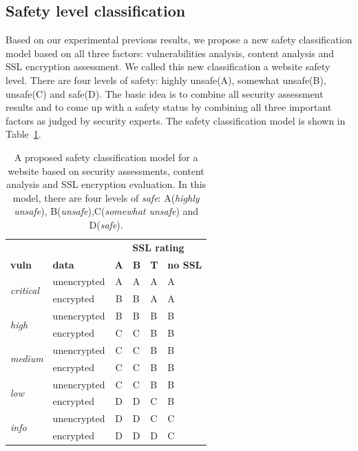 \documentclass[conference,letterpaper]{IEEEtran}
\begin{document}
\subsection{Safety level classification}

Based on our experimental previous results, we propose a new safety
classification model based on all three factors: vulnerabilities
analysis, content analysis and SSL encryption assessment. We called
this new classification a website safety level. There are four levels
of safety: highly unsafe(A), somewhat unsafe(B), unsafe(C) and
safe(D).  The basic idea is to combine all security assessment results
and to come up with a safety status by combining all three important
factors as judged by security experts. The safety classification model 
is shown in
Table~\ref{tab:class}.

\begin{table}[thbp]
  \caption{A proposed safety classification model for a website based on
    security assessments, content analysis and SSL encryption
    evaluation. In this model, there are four levels of
    \emph{safe}: A(\emph{highly unsafe}), B(\emph{unsafe}),C(\emph{somewhat unsafe}) and D(\emph{safe}).}
	\label{tab:class}
	\centering
	\begin{tabular}{llclll}
          &  & \multicolumn{4}{c}{\textbf{SSL rating}} \\ \cline{3-6} 
          \textbf{vuln}& \textbf{data} & \textbf{A} & \textbf{B} & \textbf{T} &
                                                                                \textbf{no SSL} \\ \hline
          \multirow{2}{*}{\textit{critical}} & unencrypted & A & A & A & A\\
          & encrypted & B & B & A & A \\ \hline
          \multirow{2}{*}{\textit{high}} & unencrypted & B & B & B & B \\
          & encrypted & C & C & B & B \\ \hline
          \multirow{2}{*}{\textit{medium}} & unencrypted & C & C & B & B \\
          & encrypted & C & C & B & B \\ \hline
          \multirow{2}{*}{\textit{low}} & unencrypted & C & C & B & B \\ &
                                                                           encrypted & D & D & C & B \\ \hline
          \multirow{2}{*}{\textit{info}} & unencrypted & D & D & C & C \\
          \cline{2-6}
          & encrypted & D & D & D & C \\ \hline
	\end{tabular}
	\end{table}
\end{document}
